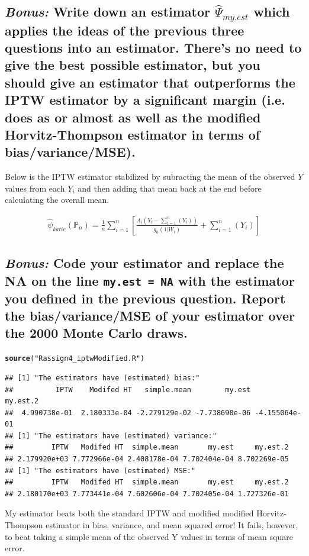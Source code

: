 \documentclass{article}\usepackage[]{graphicx}\usepackage[]{xcolor}
\makeatletter
\newcommand{\hlstr}[1]{\textcolor[rgb]{0.192,0.494,0.8}{#1}}%
\newcommand{\hlstd}[1]{\textcolor[rgb]{0.345,0.345,0.345}{#1}}%
\newcommand{\hlkwd}[1]{\textcolor[rgb]{0.737,0.353,0.396}{\textbf{#1}}}%
\newenvironment{kframe}{%
 \def\at@end@of@kframe{}%
 \ifinner\ifhmode%
  \def\at@end@of@kframe{\end{minipage}}%
  \begin{minipage}{\columnwidth}%
 \fi\fi%
 \def\FrameCommand##1{\hskip\@totalleftmargin \hskip-\fboxsep
 \colorbox{shadecolor}{##1}\hskip-\fboxsep
     \hskip-\linewidth \hskip-\@totalleftmargin \hskip\columnwidth}%
 \MakeFramed {\advance\hsize-\width
   \@totalleftmargin\z@ \linewidth\hsize
   \@setminipage}}%
 {\par\unskip\endMakeFramed%
 \at@end@of@kframe}
\newenvironment{knitrout}{}{} %
\makeatother
\begin{document}
  \subsection{\textit{Bonus:} Write down an estimator $\hat{\Psi}_{my.est}$ which applies the ideas of the previous three questions into an estimator. There's no need to give the best possible estimator, but you should give an estimator that outperforms the IPTW estimator by a significant margin (i.e. does as or almost as well as the modified Horvitz-Thompson estimator in terms of bias/variance/MSE).}
  
Below is the IPTW estimator stabilized by subracting the mean of the observed $Y$ values from each $Y_i$ and then adding that mean back at the end before calculating the overall mean.
  
\begin{align*}
\hat{\psi}_{katie}(\mathbb{P}_n)=\frac{1}{n}\sum_{i=1}^{n}[\frac{A_i(Y_i-\sum_{i=1}^{n}(Y_i))}{g_0(1|W_i)}+\sum_{i=1}^{n}(Y_i)]
\end{align*}
  
  \subsection{\textit{Bonus:} Code your estimator and replace the NA on the line \texttt{my.est = NA} with the estimator you defined in the previous question. Report the bias/variance/MSE of your estimator over the 2000 Monte Carlo draws.}

\begin{knitrout}
\color{fgcolor}\begin{kframe}
\begin{alltt}
\hlkwd{source}\hlstd{(}\hlstr{"Rassign4_iptwModified.R"}\hlstd{)}
\end{alltt}
\begin{verbatim}
## [1] "The estimators have (estimated) bias:"
##          IPTW    Modifed HT   simple.mean        my.est      my.est.2 
##  4.990738e-01  2.180333e-04 -2.279129e-02 -7.738690e-06 -4.155064e-01 
## [1] "The estimators have (estimated) variance:"
##         IPTW   Modifed HT  simple.mean       my.est     my.est.2 
## 2.179920e+03 7.772966e-04 2.408178e-04 7.702404e-04 8.702269e-05 
## [1] "The estimators have (estimated) MSE:"
##         IPTW   Modifed HT  simple.mean       my.est     my.est.2 
## 2.180170e+03 7.773441e-04 7.602606e-04 7.702405e-04 1.727326e-01
\end{verbatim}
\end{kframe}
\end{knitrout}

My estimator beats both the standard IPTW and modified modified Horvitz-Thompson estimator in bias, variance, and mean squared error! It fails, however, to beat taking a simple mean of the observed Y values in terms of mean square error.
\end{document}
